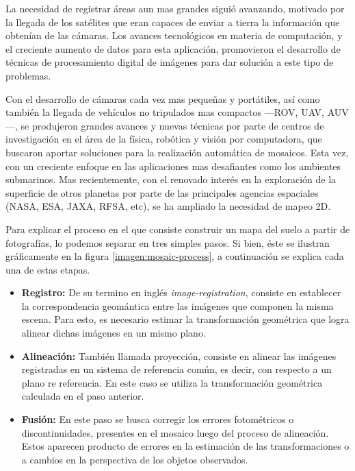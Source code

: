 La necesidad de registrar áreas aun mas grandes siguió avanzando, motivado por la llegada de los satélites que eran capaces de enviar a tierra la información que obtenían de las cámaras. Los avances tecnológicos en materia de computación, y el creciente aumento de datos para esta aplicación, promovieron el desarrollo de técnicas de procesamiento digital de imágenes para dar solución a este tipo de problemas.

Con el desarrollo de cámaras cada vez mas pequeñas y portátiles, así como también la llegada de vehículos no tripulados mas compactos ---ROV, UAV, AUV---, se produjeron grandes avances y nuevas técnicas por parte de centros de investigación en el área de la física, robótica y visión por computadora, que buscaron aportar soluciones para la realización automática de mosaicos. Esta vez, con un creciente enfoque en las aplicaciones mas desafiantes como los ambientes submarinos. Mas recientemente, con el renovado interés en la exploración de la superficie de otros planetas por parte de las principales agencias espaciales (NASA, ESA, JAXA, RFSA, etc), se ha ampliado la necesidad de mapeo 2D.

Para explicar el proceso en el que consiste construir un mapa del suelo a partir de fotografías, lo podemos separar en tres simples pasos. Si bien, éste se ilustran gráficamente en la figura \ref{imagen:mosaic-process}, a continuación se explica cada una de estas etapas.

\begin{itemize}
	\item \textbf{Registro:} De su termino en inglés \textit{image-registration}, consiste en establecer la correspondencia geomántica entre las imágenes que componen la misma escena. Para esto, es necesario estimar la transformación geométrica que logra alinear dichas imágenes en un mismo plano.
	
	\item \textbf{Alineación:} También llamada proyección, consiste en alinear las imágenes registradas en un sistema de referencia común, es decir, con respecto a un plano re referencia. En este caso se utiliza la transformación geométrica calculada en el paso anterior.
	
	\item \textbf{Fusión:} En este paso se busca corregir los errores fotométricos o discontinuidades, presentes en el mosaico luego del proceso de alineación. Estos aparecen producto de errores en la estimación de las transformaciones o a cambios en la perspectiva de los objetos observados.
\end{itemize}

